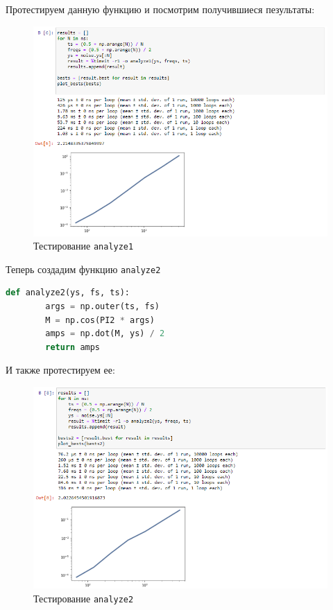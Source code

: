 \documentclass[a4paper]{article}
\begin{document}
            Протестируем данную функцию и посмотрим получившиеся пезультаты:
            
            \begin{figure}[H]
                \centering
                \includegraphics[width=\textwidth]{ex_1_analyze1_result.png}
                \caption{Тестирование \texttt{analyze1}}
                \label{fig:ex_1_analyze1_result}
            \end{figure}
            
            Теперь создадим функцию \texttt{analyze2}
            
\begin{lstlisting}[language=Python, caption= Функция \texttt{analyze2}]
    def analyze2(ys, fs, ts):
        args = np.outer(ts, fs)
        M = np.cos(PI2 * args)
        amps = np.dot(M, ys) / 2
        return amps
\end{lstlisting}
            
            И также протестируем ее:
            
             \begin{figure}[H]
                \centering
                \includegraphics[width=\textwidth]{ex_1_analyze2_result.png}
                \caption{Тестирование \texttt{analyze2}}
                \label{fig:ex_1_analyze2_result}
            \end{figure}
            
\end{document}
